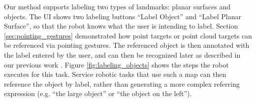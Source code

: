 \documentclass[3p]{elsarticle}
\begin{document}
Our method supports labeling two types of landmarks: planar surfaces and objects. The UI shows two labeling buttons ``Label Object'' and ``Label Planar Surface'', so that the robot knows what the user is intending to label. Section \ref{sec:pointing_gestures} demonstrated how point targets or point cloud targets can be referenced via pointing gestures. The referenced object is then annotated
with the label entered by the user, and can then be recognized later as described in our previous work \cite{trevor2013interactive}. Figure \ref{fig:labeling_objects} shows the steps the robot executes for this task. Service robotic tasks that use such a map can then reference the object
by label, rather than generating a more complex referring expression (e.g. ``the large
object'' or ``the object on the left'').

\begin{figure}
\begin{center}
\begin{minipage}{160mm}
\subfigure[]{
}
\end{minipage}
\end{center}
\end{figure}
\end{document}
